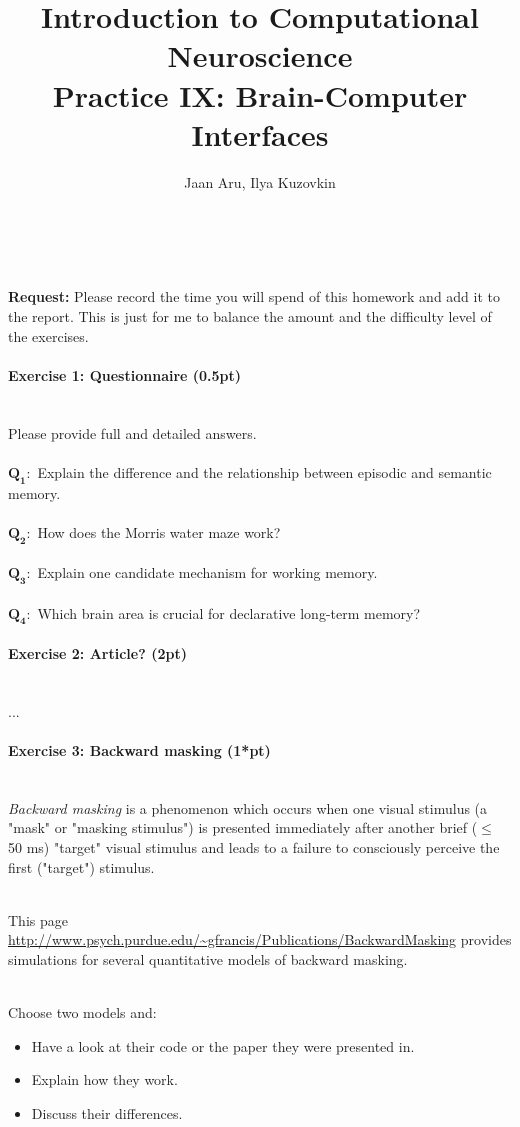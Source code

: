 \documentclass[a4paper,11pt]{article}
\author{\large{Jaan Aru, Ilya Kuzovkin}}
\title{\huge{Introduction to Computational Neuroscience}\\\LARGE{Practice IX: Brain-Computer Interfaces}}
\newenvironment{exercise}[3]{\paragraph{Exercise #1: #2 (#3pt)}\ \\}{
\medskip}
\newcommand{\question}[2]{\setlength\parindent{0mm}\ \\$\mathbf{Q_{#1}:}$ #2\ \\}
\begin{document}
\maketitle


%
%
\ \\

\ \\
\textbf{Request:} Please record the time you will spend of this homework and add it to the report. This is just for me to balance the amount and the difficulty level of the exercises.

%
% 
%
\begin{exercise}{1}{Questionnaire}{0.5}
Please provide full and detailed answers.\\
\question{1}{Explain the difference and the relationship between episodic and semantic memory.}
\question{2}{How does the Morris water maze work?}
\question{3}{Explain one candidate mechanism for working memory.}
\question{4}{Which brain area is crucial for declarative long-term memory?}
\end{exercise}


%
% 
%
\begin{exercise}{2}{Article?}{2}
...
\end{exercise}


%
%
\begin{exercise}{3}{Backward masking}{1*}
\emph{Backward masking} is a phenomenon which occurs when one visual stimulus (a "mask" or "masking stimulus") is presented immediately after another brief ($\leqslant$ 50 ms) "target" visual stimulus and leads to a failure to consciously perceive the first ("target") stimulus.

\ \\
This page \url{http://www.psych.purdue.edu/~gfrancis/Publications/BackwardMasking} provides simulations for several quantitative models of backward masking.

\ \\
Choose two models and:
\begin{itemize}
	\item Have a look at their code or the paper they were presented in.
	\item Explain how they work.
	\item Discuss their differences.
\end{itemize}

\end{exercise}
\end{document}
